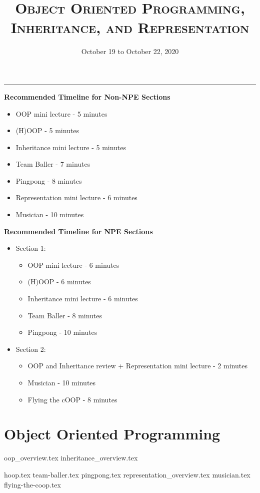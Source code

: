 \documentclass{exam}
\title{\textsc{Object Oriented Programming, Inheritance, and Representation}}
\date{October 19 to October 22, 2020}
\begin{document}
\maketitle
\rule{\textwidth}{0.15em}
\fontsize{12}{15}\selectfont

\begin{guide}
\textbf{Recommended Timeline for Non-NPE Sections}
\begin{itemize}
	\item OOP mini lecture - 5 minutes
	\item (H)OOP - 5 minutes
	\item Inheritance mini lecture - 5 minutes
	\item Team Baller - 7 minutes
	\item Pingpong - 8 minutes
	\item Representation mini lecture - 6 minutes
	\item Musician - 10 minutes
\end{itemize}
\vspace{.5cm}
\textbf{Recommended Timeline for NPE Sections}
\begin{itemize}
	\item Section 1:
	\begin{itemize}
	\item OOP mini lecture - 6 minutes
	\item (H)OOP - 6 minutes
	\item Inheritance mini lecture - 6 minutes
	\item Team Baller - 8 minutes
	\item Pingpong - 10 minutes
	\end{itemize}
	\item Section 2:
	\begin{itemize}
	\item OOP and Inheritance review + Representation mini lecture - 2 minutes
	\item Musician - 10 minutes
	\item Flying the cOOP - 8 minutes
	\end{itemize}
\end{itemize}
\end{guide}
\section{Object Oriented Programming}

{oop_overview.tex}
{inheritance_overview.tex}
\begin{questions}
{hoop.tex}
\newpage
{team-baller.tex}
{pingpong.tex}
\newpage
{representation_overview.tex}
{musician.tex}
{flying-the-coop.tex}
\end{questions}
\end{document}
